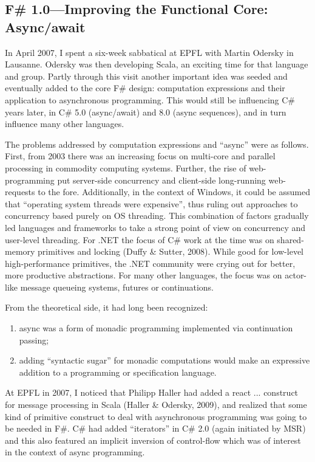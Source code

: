 \documentclass[acmsmall]{acmart}\settopmatter{}
\begin{document}
\subsection*{F\# 1.0---Improving the Functional Core: Async/await}

In April 2007, I spent a six-week sabbatical at EPFL with Martin Odersky in Lausanne.  Odersky was then developing Scala, an exciting time for that language and group. Partly through this visit another important idea was seeded and eventually added to the core F\# design: computation expressions and their application to asynchronous programming.  This would still be influencing C\# years later, in C\# 5.0 (async/await) and 8.0 (async sequences), and in turn influence many other languages. 

The problems addressed by computation expressions and “async” were as follows.  First, from 2003 there was an increasing focus on multi-core and parallel processing in commodity computing systems. Further, the rise of web-programming put server-side concurrency and client-side long-running web-requests to the fore. Additionally, in the context of Windows, it could be assumed that “operating system threads were expensive”, thus ruling out approaches to concurrency based purely on OS threading.  This combination of factors gradually led languages and frameworks to take a strong point of view on concurrency and user-level threading.  For .NET the focus of C\# work at the time was on shared-memory primitives and locking (Duffy \& Sutter, 2008). While good for low-level high-performance primitives, the .NET community were crying out for better, more productive abstractions.  For many other languages, the focus was on actor-like message queueing systems, futures or continuations.  

From the theoretical side, it had long been recognized:

\begin{enumerate}
\item async was a form of monadic programming implemented via continuation passing;
\item adding “syntactic sugar” for monadic computations would make an expressive addition to a programming or specification language.
\end{enumerate}


At EPFL in 2007, I noticed that Philipp Haller had added a react { ... } construct for message processing in Scala (Haller \& Odersky, 2009), and realized that some kind of primitive construct to deal with asynchronous programming was going to be needed in F\#.  C\# had added “iterators” in C\# 2.0 (again initiated by MSR) and this also featured an implicit inversion of control-flow which was of interest in the context of async programming.
\end{document}
